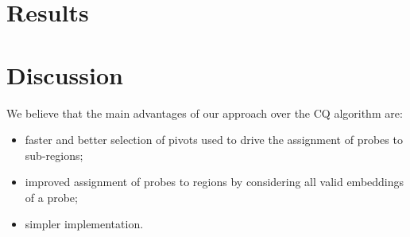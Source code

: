 \documentclass[runningheads]{llncs}
\newcommand{\ignore}[1]{}
\begin{document}
\section{Results}
\label{sec:results}

\ignore{Their results show that the running time of the Row-epitaxial algorithm
drops significantly with increasing recursion depth. The time required to place
the probes of a 500\,x\,500 chip, for instance, dropped by 69\% with $L = 3$ when
compared with the time required by the Row-epitaxial without any partitioning.

It is not clear from their experiments, however, how the choice of $L$ impaired
the performance of the Row-epitaxial algorithm in terms of solution quality since
they have restricted their experiments to $L \leq 3$. Moreover, there is no clear
trend toward reduction or increase in border length as $L$ varies from~0 to~3.}

\section{Discussion}
\label{sec:discuss}

We believe that the main advantages of our
approach over the CQ algorithm are:

\begin{itemize}
\item faster and better selection of pivots used to drive
the assignment of probes to sub-regions;
\item improved assignment of probes to regions by considering all valid embeddings
of a probe;
\item simpler implementation.
\end{itemize}
\end{document}
